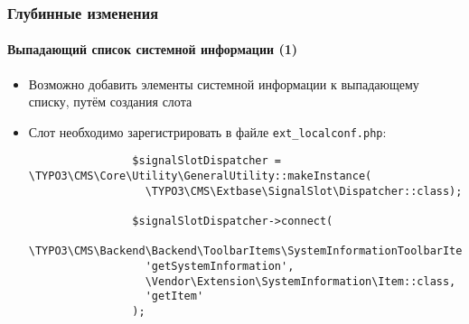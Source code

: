 \begin{frame}[fragile]
	\frametitle{Глубинные изменения}
	\framesubtitle{Выпадающий список системной информации (1)}

	\lstset{basicstyle=\tiny\ttfamily}

	\begin{itemize}
		\item Возможно добавить элементы системной информации к выпадающему списку, путём создания слота

		\item Слот необходимо зарегистрировать в файле \texttt{ext\_localconf.php}:

			\begin{lstlisting}
				$signalSlotDispatcher = \TYPO3\CMS\Core\Utility\GeneralUtility::makeInstance(
				  \TYPO3\CMS\Extbase\SignalSlot\Dispatcher::class);

				$signalSlotDispatcher->connect(
				  \TYPO3\CMS\Backend\Backend\ToolbarItems\SystemInformationToolbarItem::class,
				  'getSystemInformation',
				  \Vendor\Extension\SystemInformation\Item::class,
				  'getItem'
				);
			\end{lstlisting}

	\end{itemize}

\end{frame}

